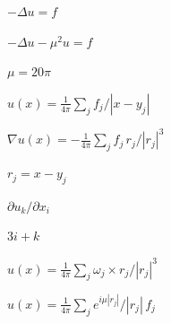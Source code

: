 \documentclass{article}
\begin{document}
$-\Delta u = f$
\pagebreak

$-\Delta u-\mu^2 u=f$
\pagebreak

$\mu=20\pi$
\pagebreak

$u(x)=\frac{1}{4\pi}\sum_j f_j/|x-y_j|$
\pagebreak

$\nabla u(x)=-\frac{1}{4\pi}\sum_j f_j\,r_j/|r_j|^3$
\pagebreak

$r_j=x-y_j$
\pagebreak

$\partial u_k/\partial x_i$
\pagebreak

$3i+k$
\pagebreak

$u(x)=\frac{1}{4\pi}\sum_j \omega_j\times r_j/|r_j|^3$
\pagebreak

$u(x)=\frac{1}{4\pi}\sum_j e^{i\mu|r_j|}/|r_j|\,f_j$
\pagebreak
\end{document}
